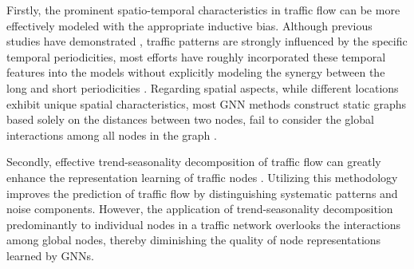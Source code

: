 
Firstly, the prominent spatio-temporal characteristics in traffic flow can be more effectively modeled with the appropriate inductive bias. Although previous studies have demonstrated \cite{zhang2017deep,yu2019citywide,guo2019ASTGCN}, traffic patterns are strongly influenced by the specific temporal periodicities, most efforts have roughly incorporated these temporal features into the models without explicitly modeling the synergy between the long and short periodicities \cite{chen2018price,deng2024parsimony}. Regarding spatial aspects, while different locations exhibit unique spatial characteristics, most GNN methods construct static graphs based solely on the distances between two nodes, fail to consider the global interactions among all nodes in the graph \cite{yin2021survey}.

Secondly, effective trend-seasonality decomposition of traffic flow can greatly enhance the representation learning of traffic nodes \cite{wu2021Autoformer, fang2023STWave}. Utilizing this methodology improves the prediction of traffic flow by distinguishing systematic patterns and noise components. However, the application of trend-seasonality decomposition predominantly to individual nodes in a traffic network overlooks the interactions among global nodes, thereby diminishing the quality of node representations learned by GNNs.


